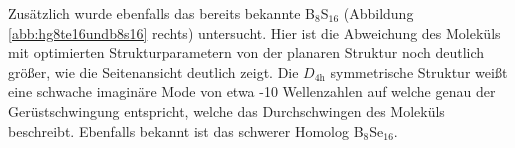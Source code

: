 Zusätzlich wurde ebenfalls das bereits bekannte B$_8$S$_{16}$\supercite{krebs1980b8s16} (Abbildung \ref{abb:hg8te16undb8s16} rechts) untersucht. Hier ist die Abweichung des Moleküls mit optimierten Strukturparametern von der planaren Struktur noch deutlich größer, wie die Seitenansicht deutlich zeigt. Die $D_{4\textrm{h}}$ symmetrische Struktur weißt eine schwache imaginäre Mode von etwa -10 Wellenzahlen auf welche genau der Gerüstschwingung entspricht, welche das Durchschwingen des Moleküls beschreibt. Ebenfalls bekannt ist das schwerer Homolog B$_8$Se$_{16}$.

